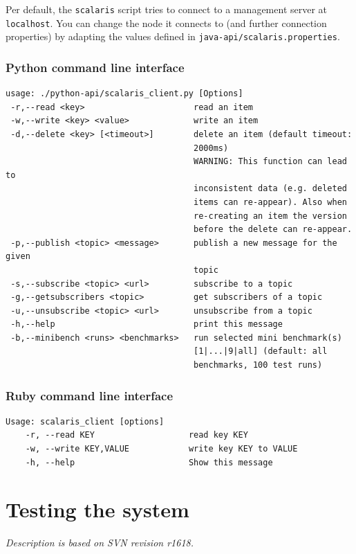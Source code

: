 \documentclass[a4paper]{scrreprt}
\newcommand{\code}[1]{\lstinline[basicstyle=\ttfamily]!#1!}
\newcommand{\svnrev}[1]
{\hfill\emph{Description is based on SVN revision #1.}\medskip}
\begin{document}
Per default, the \code{scalaris} script tries to connect to a management
server at \code{localhost}. You can change the node it connects to (and
further connection properties) by adapting the values defined in
\code{java-api/scalaris.properties}.

\subsection{Python command line interface}

\begin{lstlisting}[language={}]
%> ./python-api/scalaris_client.py --help
usage: ./python-api/scalaris_client.py [Options]
 -r,--read <key>                      read an item
 -w,--write <key> <value>             write an item
 -d,--delete <key> [<timeout>]        delete an item (default timeout:
                                      2000ms)
                                      WARNING: This function can lead to
                                      inconsistent data (e.g. deleted
                                      items can re-appear). Also when
                                      re-creating an item the version
                                      before the delete can re-appear.
 -p,--publish <topic> <message>       publish a new message for the given
                                      topic
 -s,--subscribe <topic> <url>         subscribe to a topic
 -g,--getsubscribers <topic>          get subscribers of a topic
 -u,--unsubscribe <topic> <url>       unsubscribe from a topic
 -h,--help                            print this message
 -b,--minibench <runs> <benchmarks>   run selected mini benchmark(s)
                                      [1|...|9|all] (default: all
                                      benchmarks, 100 test runs)
\end{lstlisting}

\subsection{Ruby command line interface}

\begin{lstlisting}[language={}]
%> ./ruby-api/scalaris_client.rb --help
Usage: scalaris_client [options]
    -r, --read KEY                   read key KEY
    -w, --write KEY,VALUE            write key KEY to VALUE
    -h, --help                       Show this message
\end{lstlisting}


\chapter{Testing the system}
\svnrev{r1618}
\end{document}
